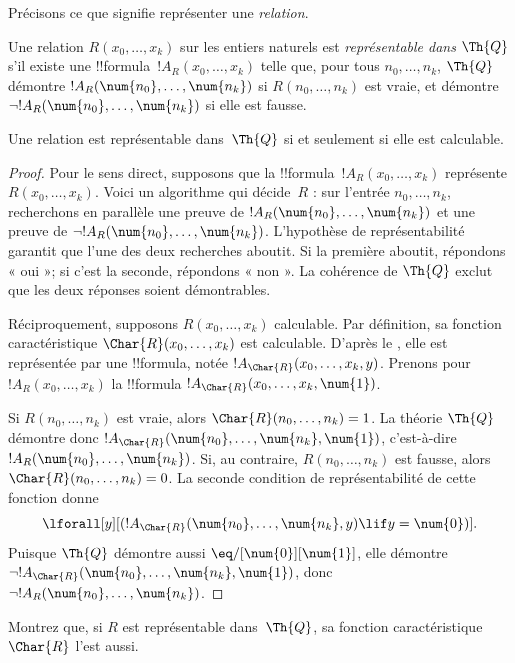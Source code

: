 \documentclass[../../../include/open-logic-section]{subfiles}
\begin{document}


Précisons ce que signifie représenter une \emph{relation}.

\begin{defn}
Une relation $R(x_0,\dots,x_k)$ sur les entiers naturels est
{\em représentable dans $\Th{Q}$} s'il existe une
!!{formula}~$!A_R(x_0,\dots,x_k)$ telle que, pour tous
$n_0,\dots,n_k$, $\Th{Q}$ démontre
$!A_R(\num{n_0},\dots,\num{n_k})$ si
$R(n_0,\dots,n_k)$ est vraie, et démontre
$\lnot !A_R(\num{n_0},\dots,\num{n_k})$ si elle est fausse.
\end{defn}

\begin{thm}
Une relation est représentable dans~$\Th{Q}$ si et seulement
si elle est calculable.
\end{thm}

\begin{proof}
Pour le sens direct, supposons que la
!!{formula}~$!A_R(x_0,\dots,x_k)$ représente
$R(x_0,\dots,x_k)$. Voici un algorithme qui décide~$R$ :
sur l'entrée $n_0,\dots,n_k$, recherchons en parallèle une
preuve de $!A_R(\num{n_0},\dots,\num{n_k})$ et une preuve
de $\lnot !A_R(\num{n_0},\dots,\num{n_k})$.
L'hypothèse de représentabilité garantit que l'une des deux
recherches aboutit. Si la première aboutit, répondons « oui »;
si c'est la seconde, répondons « non ». La cohérence de
$\Th{Q}$ exclut que les deux réponses soient démontrables.

Réciproquement, supposons $R(x_0,\dots,x_k)$ calculable.
Par définition, sa fonction caractéristique
$\Char{R}(x_0,\dots,x_k)$ est calculable. D'après le
, elle est
représentée par une !!{formula}, notée
$!A_{\Char{R}}(x_0,\dots,x_k,y)$. Prenons pour
$!A_R(x_0,\dots,x_k)$ la !!{formula}
$!A_{\Char{R}}(x_0,\dots,x_k,\num{1})$.

Si $R(n_0,\dots,n_k)$ est vraie, alors
$\Char{R}(n_0,\dots,n_k)=1$. La théorie $\Th{Q}$ démontre
donc $!A_{\Char{R}}(\num{n_0},\dots,\num{n_k},\num{1})$,
c'est-à-dire $!A_R(\num{n_0},\dots,\num{n_k})$.
Si, au contraire, $R(n_0,\dots,n_k)$ est fausse, alors
$\Char{R}(n_0,\dots,n_k)=0$. La seconde condition de
représentabilité de cette fonction donne
\[
\lforall[y][(!A_{\Char{R}}(\num{n_0}, \dots, \num{n_k}, y) \lif y =
  \num{0})].
\]
Puisque $\Th{Q}$ démontre aussi
$\eq/[\num{0}][\num{1}]$, elle démontre
$\lnot !A_{\Char{R}}(\num{n_0},\dots,\num{n_k},\num{1})$,
donc $\lnot !A_R(\num{n_0},\dots,\num{n_k})$.
\end{proof}

\begin{prob}
Montrez que, si $R$ est représentable dans~$\Th{Q}$,
sa fonction caractéristique $\Char{R}$ l'est aussi.
\end{prob}
\end{document}
